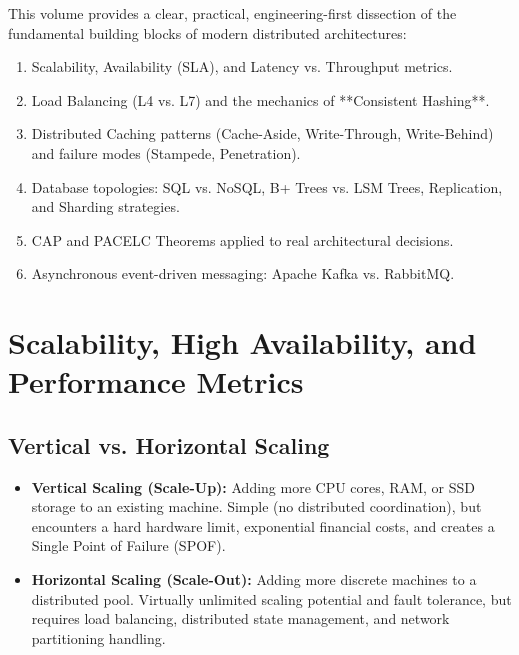 \documentclass[10pt,journal,compsoc,onecolumn]{IEEEtran}
\begin{document}
This volume provides a clear, practical, engineering-first dissection of the fundamental building blocks of modern distributed architectures:
\begin{enumerate}
    \item Scalability, Availability (SLA), and Latency vs. Throughput metrics.
    \item Load Balancing (L4 vs. L7) and the mechanics of **Consistent Hashing**.
    \item Distributed Caching patterns (Cache-Aside, Write-Through, Write-Behind) and failure modes (Stampede, Penetration).
    \item Database topologies: SQL vs. NoSQL, B+ Trees vs. LSM Trees, Replication, and Sharding strategies.
    \item CAP and PACELC Theorems applied to real architectural decisions.
    \item Asynchronous event-driven messaging: Apache Kafka vs. RabbitMQ.
\end{enumerate}

\section{Scalability, High Availability, and Performance Metrics}
\label{sec:metrics}

\subsection{Vertical vs. Horizontal Scaling}
\begin{itemize}
    \item \textbf{Vertical Scaling (Scale-Up):} Adding more CPU cores, RAM, or SSD storage to an existing machine. Simple (no distributed coordination), but encounters a hard hardware limit, exponential financial costs, and creates a Single Point of Failure (SPOF).
    \item \textbf{Horizontal Scaling (Scale-Out):} Adding more discrete machines to a distributed pool. Virtually unlimited scaling potential and fault tolerance, but requires load balancing, distributed state management, and network partitioning handling.
\end{itemize}
\end{document}
